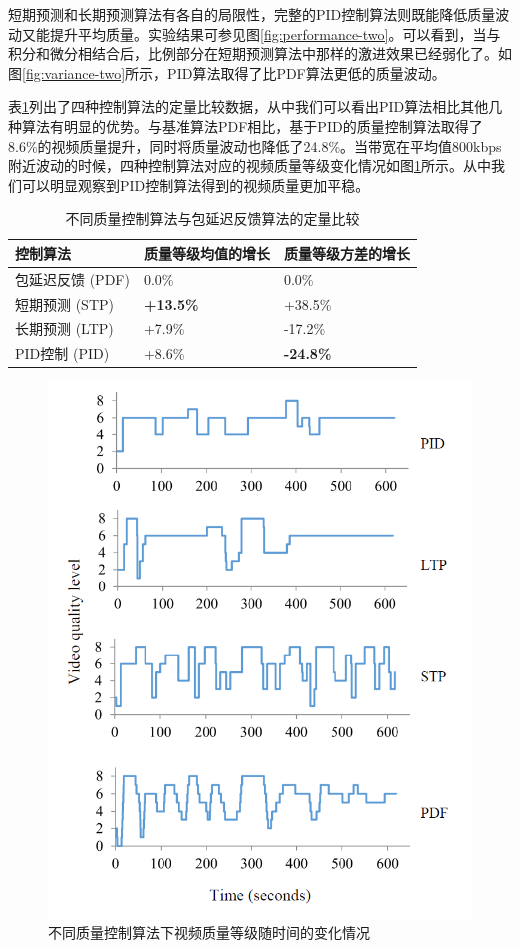 短期预测和长期预测算法有各自的局限性，完整的PID控制算法则既能降低质量波动又能提升平均质量。实验结果可参见图\ref{fig:performance-two}。可以看到，当与积分和微分相结合后，比例部分在短期预测算法中那样的激进效果已经弱化了。如图\ref{fig:variance-two}所示，PID算法取得了比PDF算法更低的质量波动。

表\ref{tab:improvement}列出了四种控制算法的定量比较数据，从中我们可以看出PID算法相比其他几种算法有明显的优势。与基准算法PDF相比，基于PID的质量控制算法取得了8.6\%的视频质量提升，同时将质量波动也降低了24.8\%。当带宽在平均值800kbps附近波动的时候，四种控制算法对应的视频质量等级变化情况如图\ref{fig:fluctuation}所示。从中我们可以明显观察到PID控制算法得到的视频质量更加平稳。

\begin{table}[h]
\centering
\caption{不同质量控制算法与包延迟反馈算法的定量比较}
\label{tab:improvement}
\begin{tabular}[b]{p{4.2cm}<{\centering}|p{4.2cm}<{\centering}|p{4.2cm}<{\centering}}
\hline \hline
控制算法 & 质量等级均值的增长 & 质量等级方差的增长 \\ \hline
包延迟反馈 (PDF) & 0.0\% & 0.0\% \\ \hline
短期预测 (STP) & \textbf{+13.5\%} & +38.5\% \\ \hline
长期预测 (LTP) & +7.9\% & -17.2\% \\ \hline
PID控制 (PID) & +8.6\% & \textbf{-24.8\%} \\ \hline
\end{tabular}
\end{table}

\begin{figure}
\centering
\includegraphics[width = 0.45\linewidth]{figures/Fluctuation.png}
\caption{不同质量控制算法下视频质量等级随时间的变化情况 \label{fig:fluctuation}}
\end{figure}

